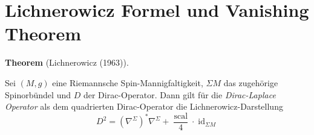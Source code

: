 \documentclass[10pt, letterpaper]{article}
\newcommand{\CustomHeading}[3]{%
  \par\medskip\noindent%
  \textbf{#1 #2} \textnormal{(#3)}.\enskip%
}
\newenvironment{THEO}[2]{\CustomHeading{Theorem}{#1}{#2}}{}
\begin{document}
\pagebreak

\section{Lichnerowicz Formel und Vanishing Theorem}






\begin{THEO}{}{Lichnerowicz (1963)}
Sei $(M,g)$ eine Riemannsche Spin-Mannigfaltigkeit, $\Sigma M$ das zugehörige
Spinorbündel und $D$ der Dirac-Operator. Dann gilt für die \emph{Dirac-Laplace Operator} als dem quadrierten Dirac-Operator die Lichnerowicz-Darstellung
$$
D^2=\left(\nabla^{\Sigma}\right)^* \nabla^{\Sigma}+\frac{\operatorname{scal}}{4} \cdot \operatorname{id}_{\Sigma M}
$$  
\end{THEO}
\end{document}

